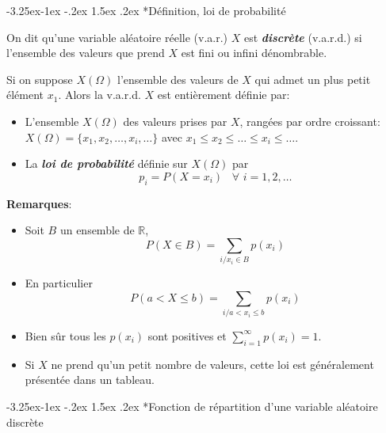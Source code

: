 \documentclass[]{book}
\makeatletter
\renewcommand\subsection{\@startsection{subsection}{2}{\z@}%
                                     {-3.25ex\@plus -1ex \@minus -.2ex}%
                                     {1.5ex \@plus .2ex}%
                                     {\normalfont\large\bfseries\color{Violet}}}
\theoremstyle{magentacolor}
\theoremstyle{proprie}
\theoremstyle{exstyle}
\theoremstyle{exostyle}
\theoremstyle{definition}
\theoremstyle{definition}
\theoremstyle{definition}
\theoremstyle{remark}
\let\BeginKnitrBlock\begin \let\EndKnitrBlock\end
\makeatother
\begin{document}
\hypertarget{definition-loi-de-probabilite}{%
\subsection*{Définition, loi de probabilité}\label{definition-loi-de-probabilite}}

\BeginKnitrBlock{definition}
\protect\hypertarget{def:unnamed-chunk-6}{}{\label{def:unnamed-chunk-6} }On dit qu'une variable aléatoire réelle (v.a.r.) \(X\) est \textbf{\emph{discrète}}
(v.a.r.d.) si l'ensemble des valeurs que prend \(X\) est fini ou infini
dénombrable.

Si on suppose \(X(\Omega)\) l'ensemble des valeurs de \(X\) qui admet un
plus petit élément \(x_1\). Alors la v.a.r.d. \(X\) est entièrement définie
par:

\begin{itemize}
\item
  L'ensemble \(X(\Omega)\) des valeurs prises par \(X\), rangées par ordre
  croissant: \(X(\Omega) = \{x_1, x_2,\ldots,x_i,\ldots\}\) avec
  \(x_1 \leq x_2 \leq \ldots \leq x_i \leq \ldots\).
\item
  La \textbf{\emph{loi de probabilité}} définie sur \(X(\Omega)\) par
  \[p_i = P(X=x_i) \,\,\,\,\, \forall \,\, i=1,2,\ldots\]
\end{itemize}
\EndKnitrBlock{definition}

\textbf{Remarques}:

\begin{itemize}
\item
  Soit \(B\) un ensemble de \(\mathbb{R}\),
  \[P(X \in B) = \sum_{i / x_i \in B} p(x_i)\]
\item
  En particulier
  \[P( a < X \leq b) =  \sum_{i / a < x_i \leq b} p(x_i)\]
\item
  Bien sûr tous les \(p(x_i)\) sont positives et
  \(\sum_{i=1}^{\infty} p(x_i) =1\).
\item
  Si \(X\) ne prend qu'un petit nombre de valeurs, cette loi est
  généralement présentée dans un tableau.
\end{itemize}

\hypertarget{fonction-de-repartition-dune-variable-aleatoire-discrete}{%
\subsection*{Fonction de répartition d'une variable aléatoire discrète}\label{fonction-de-repartition-dune-variable-aleatoire-discrete}}
\end{document}
